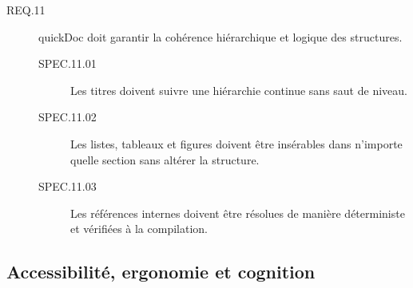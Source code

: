 \documentclass[a4paper,12pt]{article}
\begin{document}
\begin{description}
\item[{\label{orge13bf17}REQ.11}] quickDoc doit garantir la cohérence hiérarchique et logique des structures.
\begin{description}
\item[{\label{orgd03654e}SPEC.11.01}] Les titres doivent suivre une hiérarchie continue sans saut de niveau.
\item[{\label{org69af918}SPEC.11.02}] Les listes, tableaux et figures doivent être insérables dans n’importe quelle section sans altérer la structure.
\item[{\label{org80f009b}SPEC.11.03}] Les références internes doivent être résolues de manière déterministe et vérifiées à la compilation.
\end{description}
\end{description}
\subsection{Accessibilité, ergonomie et cognition}
\label{sec:org36cdb89}
\end{document}
